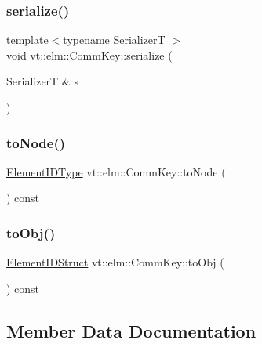 \subsubsection{\texorpdfstring{serialize()}{serialize()}}
{\footnotesize\ttfamily template$<$typename SerializerT $>$ \\
void vt\+::elm\+::\+Comm\+Key\+::serialize (\begin{DoxyParamCaption}\item[{SerializerT \&}]{s }\end{DoxyParamCaption})\hspace{0.3cm}{\ttfamily [inline]}}

\mbox{\label{structvt_1_1elm_1_1_comm_key_a049276643e77cfea00a68e5dcaa87eb2}} 
\subsubsection{\texorpdfstring{to\+Node()}{toNode()}}
{\footnotesize\ttfamily \hyperlink{namespacevt_1_1elm_a63afb64985b41b7b6dcf2f01336391f8}{Element\+I\+D\+Type} vt\+::elm\+::\+Comm\+Key\+::to\+Node (\begin{DoxyParamCaption}{ }\end{DoxyParamCaption}) const\hspace{0.3cm}{\ttfamily [inline]}}

\mbox{\label{structvt_1_1elm_1_1_comm_key_a4dd567c04eea5bb8aeb2acd7ad8f01de}} 
\subsubsection{\texorpdfstring{to\+Obj()}{toObj()}}
{\footnotesize\ttfamily \hyperlink{structvt_1_1elm_1_1_element_i_d_struct}{Element\+I\+D\+Struct} vt\+::elm\+::\+Comm\+Key\+::to\+Obj (\begin{DoxyParamCaption}{ }\end{DoxyParamCaption}) const\hspace{0.3cm}{\ttfamily [inline]}}



\subsection{Member Data Documentation}
\mbox{\label{structvt_1_1elm_1_1_comm_key_a96646f0648cd255cf4cdc37bcc3597ac}} 
